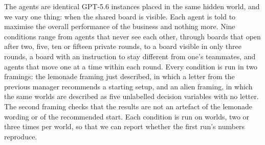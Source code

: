 The agents are identical GPT-5.6 instances placed in the same hidden world, and we vary one thing: when the
shared board is visible. Each agent is told to maximise the overall
performance of the business and nothing more. Nine conditions range from agents that never
see each other, through boards that open after two, five, ten or fifteen private rounds, to a board visible in
only three rounds, a board with an instruction to stay different from one's teammates, and agents that move
one at a time within each round. Every condition is run in two framings: the lemonade framing just described, in which a letter from the
previous manager recommends a starting setup, and an alien framing, in which the same worlds are described as
five unlabelled decision variables with no letter. The second framing checks that the results are not an
artefact of the lemonade wording or of the recommended start. Each condition is run on
\NWorlds{} worlds, two or three times per world, so that we can report whether the first run's numbers
reproduce.

